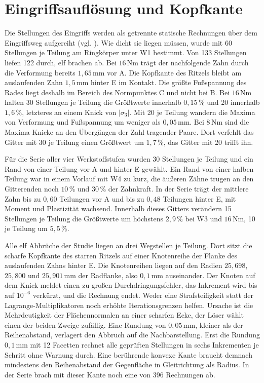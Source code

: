 \section{Eingriffsauflösung und Kopfkante}
\label{sec:kopfkante}

Die Stellungen des Eingriffs werden als getrennte statische Rechnungen über dem Eingriffsweg aufgereiht (vgl. ). Wie dicht sie liegen müssen, wurde mit 60 Stellungen je Teilung am Ringkörper unter W1 bestimmt. Von 133 Stellungen liefen 122 durch, elf brachen ab. Bei $16$\,Nm trägt der nachfolgende Zahn durch die Verformung bereits $1{,}65$\,mm vor A. Die Kopfkante des Ritzels bleibt am auslaufenden Zahn $1{,}5$\,mm hinter E im Kontakt. Die größte Fußspannung des Rades liegt deshalb im Bereich des Normpunktes C und nicht bei B. Bei $16$\,Nm halten 30 Stellungen je Teilung die Größtwerte innerhalb $0{,}15$\,\% und 20 innerhalb $1{,}6$\,\%, letzteres an einem Knick von $|\sigma_{\mathrm{3}}|$. Mit 20 je Teilung wandern die Maxima von Verformung und Fußspannung um weniger als $0{,}05$\,mm. Bei $8$\,Nm sind die Maxima Knicke an den Übergängen der Zahl tragender Paare. Dort verfehlt das Gitter mit 30 je Teilung einen Größtwert um $1{,}7$\,\%, das Gitter mit 20 trifft ihn.

Für die Serie aller vier Werkstoffstufen wurden 30 Stellungen je Teilung und ein Rand von einer Teilung vor A und hinter E gewählt. Ein Rand von einer halben Teilung war in einem Vorlauf mit W4 zu kurz, die äußeren Zähne trugen an den Gitterenden noch $10$\,\% und $30$\,\% der Zahnkraft. In der Serie trägt der mittlere Zahn bis zu $0{,}60$ Teilungen vor A und bis zu $0{,}48$ Teilungen hinter E, mit Moment und Plastizität wachsend. Innerhalb dieses Gitters verändern 15 Stellungen je Teilung die Größtwerte um höchstens $2{,}9$\,\% bei W3 und $16$\,Nm, 10 je Teilung um $5{,}5$\,\%.

Alle elf Abbrüche der Studie liegen an drei Wegstellen je Teilung. Dort sitzt die scharfe Kopfkante des starren Ritzels auf einer Knotenreihe der Flanke des auslaufenden Zahns hinter E. Die Knotenreihen liegen auf den Radien $25{,}698$, $25{,}800$ und $25{,}901$\,mm der Radflanke, also $0{,}1$\,mm auseinander. Der Knoten auf dem Knick meldet einen zu großen Durchdringungsfehler, das Inkrement wird bis auf $10^{-6}$ verkürzt, und die Rechnung endet. Weder eine Strafsteifigkeit statt der Lagrange-Multiplikatoren noch erhöhte Iterationsgrenzen helfen. Ursache ist die Mehrdeutigkeit der Flächennormalen an einer scharfen Ecke, der Löser wählt einen der beiden Zweige zufällig. Eine Rundung von $0{,}05$\,mm, kleiner als der Reihenabstand, verlagert den Abbruch auf die Nachbarstellung. Erst die Rundung $0{,}1$\,mm mit 12 Facetten rechnet alle geprüften Stellungen in sechs Inkrementen je Schritt ohne Warnung durch. Eine berührende konvexe Kante braucht demnach mindestens den Reihenabstand der Gegenfläche in Gleitrichtung als Radius. In der Serie brach mit dieser Kante noch eine von 396 Rechnungen ab.

